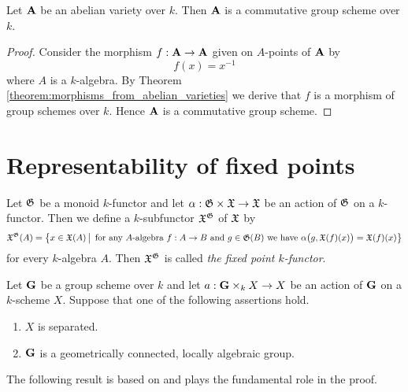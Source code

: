 \begin{corollary}\label{corollary:abelian_varieties_are_commutative}
Let $\mathbf{A}$ be an abelian variety over $k$. Then $\mathbf{A}$ is a commutative group scheme over $k$.
\end{corollary}
\begin{proof}
Consider the morphism $f:\mathbf{A}\rightarrow \mathbf{A}$ given on $A$-points of $\mathbf{A}$ by
$$f(x) = x^{-1}$$
where $A$ is a $k$-algebra. By Theorem \ref{theorem:morphisms_from_abelian_varieties} we derive that $f$ is a morphism of group schemes over $k$. Hence $\mathbf{A}$ is a commutative group scheme.
\end{proof}

\section{Representability of fixed points}

\begin{definition}
Let ${\mathfrak G}$ be a monoid $k$-functor and let $\alpha:{\mathfrak G}\times {\mathfrak X}\rightarrow {\mathfrak X}$ be an action of ${\mathfrak G}$ on a $k$-functor. Then we define a $k$-subfunctor ${\mathfrak X}^{{\mathfrak G}}$ of ${\mathfrak X}$ by
$${\mathfrak X}^{{\mathfrak G}}(A) = \big\{x\in {\mathfrak X}(A)\,\big|\,\mbox{ for any }A\mbox{-algebra }f:A\rightarrow B\mbox{ and }g\in {\mathfrak G}(B)\mbox{ we have }\alpha\big(g,{\mathfrak X}(f)(x)\big) = {\mathfrak X}(f)(x)\big\}$$
for every $k$-algebra $A$. Then ${\mathfrak X}^{{\mathfrak G}}$ is called \textit{the fixed point $k$-functor}.
\end{definition}

\begin{theorem}\label{theorem:fixed_points_existence}
Let $\mathbf{G}$ be a group scheme over $k$ and let $a:\mathbf{G}\times_kX\rightarrow X$ be an action of $\mathbf{G}$ on a $k$-scheme $X$. Suppose that one of the following assertions hold.
\begin{enumerate}[label=\emph{\textbf{(\roman*)}}, leftmargin=3.0em]
\item $X$ is separated.
\item $\mathbf{G}$ is a geometrically connected, locally algebraic group.
\end{enumerate}
\end{theorem}
\noindent
The following result is based on {\cite[Theorem 6.2]{kfunctors}} and plays the fundamental role in the proof.

